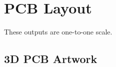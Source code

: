 
\chapter{PCB Layout} %
\label{AppendixB} %

These outputs are one-to-one scale.



\section{3D PCB Artwork}
	

